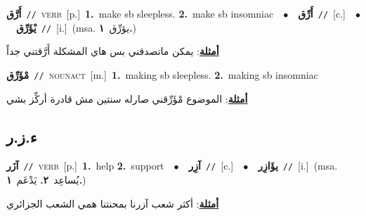 \documentclass[10pt,a4paper,twoside]{article} %
\begin{document}
\begin{multicols}{2}
{\setlength\topsep{0pt}\textbf{\foreignlanguage{arabic}{أَرَّق}}\ {\color{gray}\texttt{//}\color{black}}\ \textsc{verb}\ [p.]\ \textbf{1.}~make sb sleepless.  \textbf{2.}~make sb insomniac\ \ $\bullet$\ \ \setlength\topsep{0pt}\textbf{\foreignlanguage{arabic}{أَرِّق}}\ {\color{gray}\texttt{//}\color{black}}\ [c.]\ \ $\bullet$\ \ \setlength\topsep{0pt}\textbf{\foreignlanguage{arabic}{يْؤَرِّق}}\ {\color{gray}\texttt{//}\color{black}}\ [i.]\ \color{gray}(msa. \foreignlanguage{arabic}{يؤرِّق}~\foreignlanguage{arabic}{\textbf{١.}})\color{black}\  \begin{flushright}\color{gray}\foreignlanguage{arabic}{\textbf{\underline{\foreignlanguage{arabic}{أمثلة}}}: يمكن ماتصدقني بس هاي المشكلة أَرَّقتني جداً}\end{flushright}\color{black}} \vspace{2mm}

{\setlength\topsep{0pt}\textbf{\foreignlanguage{arabic}{مْؤَرِّق}}\ {\color{gray}\texttt{//}\color{black}}\ \textsc{noun\textunderscore act}\ [m.]\ \textbf{1.}~making sb sleepless.  \textbf{2.}~making sb insomniac\  \begin{flushright}\color{gray}\foreignlanguage{arabic}{\textbf{\underline{\foreignlanguage{arabic}{أمثلة}}}: الموضوع مْؤَرِّقني صارله سنتين مش قادرة أركِّز بشي}\end{flushright}\color{black}} \vspace{2mm}

\vspace{-3mm}
\subsection*{\color{blue}\foreignlanguage{arabic}{ء.ز.ر}\color{blue}{}} 

{\setlength\topsep{0pt}\textbf{\foreignlanguage{arabic}{آزَر}}\ {\color{gray}\texttt{//}\color{black}}\ \textsc{verb}\ [p.]\ \textbf{1.}~help  \textbf{2.}~support\ \ $\bullet$\ \ \setlength\topsep{0pt}\textbf{\foreignlanguage{arabic}{آزِر}}\ {\color{gray}\texttt{//}\color{black}}\ [c.]\ \ $\bullet$\ \ \setlength\topsep{0pt}\textbf{\foreignlanguage{arabic}{يؤَازِر}}\ {\color{gray}\texttt{//}\color{black}}\ [i.]\ \color{gray}(msa. \foreignlanguage{arabic}{يُساعِد}~\foreignlanguage{arabic}{\textbf{٢.}}  \foreignlanguage{arabic}{يَدْعَم}~\foreignlanguage{arabic}{\textbf{١.}})\color{black}\  \begin{flushright}\color{gray}\foreignlanguage{arabic}{\textbf{\underline{\foreignlanguage{arabic}{أمثلة}}}: أكثر شعب آزرنا بمحنتنا همي الشعب الجزائري}\end{flushright}\color{black}} \vspace{2mm}


\end{multicols}
\end{document}
